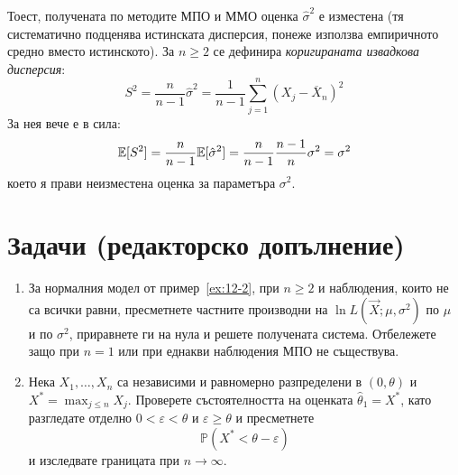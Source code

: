 Тоест, получената по методите МПО и ММО оценка $\hat{\sigma}^2$ е изместена (тя систематично подценява истинската дисперсия, понеже използва емпиричното средно вместо истинското). За $n\ge2$ се дефинира \emph{коригираната извадкова дисперсия}:
\[
    S^2 = \frac{n}{n-1} \hat{\sigma}^2 = \frac{1}{n-1} \sum_{j=1}^{n} (X_j - \overline{X}_n)^2
\]
За нея вече е в сила:
\[
    \mathbb{E}[S^2] = \frac{n}{n-1} \mathbb{E}[\hat{\sigma}^2] = \frac{n}{n-1} \frac{n-1}{n} \sigma^2 = \sigma^2
\]
което я прави неизместена оценка за параметъра $\sigma^2$.

\section{Задачи (редакторско допълнение)}

\begin{enumerate}
    \item За нормалния модел от пример~\ref{ex:12-2}, при $n\ge2$ и наблюдения, които не са всички равни, пресметнете частните производни на $\ln L(\vec{X};\mu,\sigma^2)$ по $\mu$ и по $\sigma^2$, приравнете ги на нула и решете получената система. Отбележете защо при $n=1$ или при еднакви наблюдения МПО не съществува.

    \item Нека $X_1,\dots,X_n$ са независими и равномерно разпределени в $(0,\theta)$ и $X^*=\max_{j\le n}X_j$. Проверете състоятелността на оценката $\hat\theta_1=X^*$, като разгледате отделно $0<\varepsilon<\theta$ и $\varepsilon\ge\theta$ и пресметнете
    \[
    \mathbb{P}(X^*<\theta-\varepsilon)
    \]
    и изследвате границата при $n\to\infty$.
\end{enumerate}

